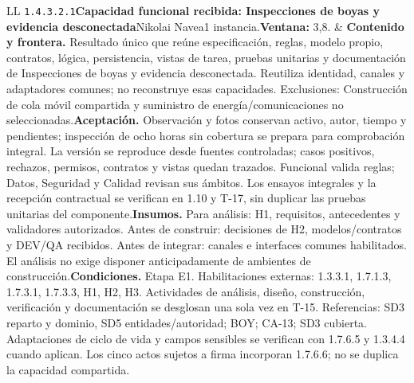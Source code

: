 \begin{longtable}{L{\tabcolsep\relax}L{\tabcolsep\relax}}
\texttt{1.\allowbreak{}4.\allowbreak{}3.\allowbreak{}2.\allowbreak{}1}\newline{}\textbf{Capacidad funcional recibida: Inspecciones de boyas y evidencia desconectada}\newline{}Nikolai Navea\newline{}1 instancia.\newline{}\textbf{Ventana:} 3,8. & \textbf{Contenido y frontera.} Resultado único que reúne especificación, reglas, modelo propio, contratos, lógica, persistencia, vistas de tarea, pruebas unitarias y documentación de Inspecciones de boyas y evidencia desconectada. Reutiliza identidad, canales y adaptadores comunes; no reconstruye esas capacidades. Exclusiones: Construcción de cola móvil compartida y suministro de energía/comunicaciones no seleccionadas.\newline{}\textbf{Aceptación.} Observación y fotos conservan activo, autor, tiempo y pendientes; inspección de ocho horas sin cobertura se prepara para comprobación integral. La versión se reproduce desde fuentes controladas; casos positivos, rechazos, permisos, contratos y vistas quedan trazados. Funcional valida reglas; Datos, Seguridad y Calidad revisan sus ámbitos. Los ensayos integrales y la recepción contractual se verifican en 1.10 y T-17, sin duplicar las pruebas unitarias del componente.\newline{}\textbf{Insumos.} Para análisis: H1, requisitos, antecedentes y validadores autorizados. Antes de construir: decisiones de H2, modelos/contratos y DEV/QA recibidos. Antes de integrar: canales e interfaces comunes habilitados. El análisis no exige disponer anticipadamente de ambientes de construcción.\newline{}\textbf{Condiciones.} Etapa E1. Habilitaciones externas: 1.3.3.1, 1.7.1.3, 1.7.3.1, 1.7.3.3, H1, H2, H3. Actividades de análisis, diseño, construcción, verificación y documentación se desglosan una sola vez en T-15. Referencias: SD3 reparto y dominio, SD5 entidades/autoridad; BOY; CA-13; SD3 cubierta. Adaptaciones de ciclo de vida y campos sensibles se verifican con 1.7.6.5 y 1.3.4.4 cuando aplican. Los cinco actos sujetos a firma incorporan 1.7.6.6; no se duplica la capacidad compartida.\\\hline

\end{longtable}

